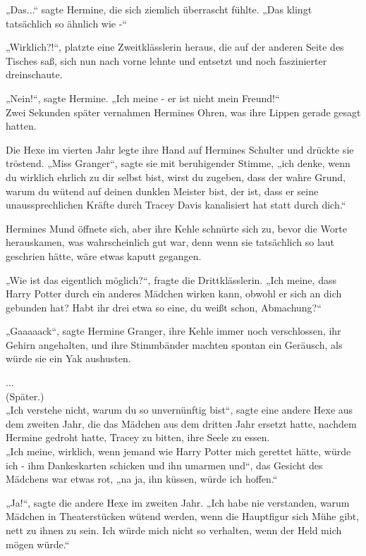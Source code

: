 {„Das...“ sagte Hermine, die sich ziemlich überrascht fühlte. „Das klingt tatsächlich so ähnlich wie -“

„Wirklich?!“, platzte eine Zweitklässlerin heraus, die auf der anderen Seite des Tisches saß, sich nun nach vorne lehnte und entsetzt und noch faszinierter dreinschaute.

„Nein!“, sagte Hermine. „Ich meine - er ist nicht mein Freund!“\\ Zwei Sekunden später vernahmen Hermines Ohren, was ihre Lippen gerade gesagt\\ hatten.

Die Hexe im vierten Jahr legte ihre Hand auf Hermines Schulter und drückte sie tröstend. „Miss Granger“, sagte sie mit beruhigender Stimme, „ich denke, wenn du wirklich ehrlich zu dir selbst bist, wirst du zugeben, dass der wahre Grund, warum du wütend auf deinen dunklen Meister bist, der ist, dass er seine unaussprechlichen Kräfte durch Tracey Davis kanalisiert hat statt durch dich.“

Hermines Mund öffnete sich, aber ihre Kehle schnürte sich zu, bevor die Worte herauskamen, was wahrscheinlich gut war, denn wenn sie tatsächlich so laut geschrien hätte, wäre etwas kaputt gegangen.

„Wie ist das eigentlich möglich?“, fragte die Drittklässlerin. „Ich meine, dass Harry Potter durch ein anderes Mädchen wirken kann, obwohl er sich an dich gebunden hat? Habt ihr drei etwa so eine, du weißt schon, Abmachung?“

„Gaaaaack“, sagte Hermine Granger, ihre Kehle immer noch verschlossen, ihr Gehirn angehalten, und ihre Stimmbänder machten spontan ein Geräusch, als würde sie ein Yak aushusten.

...\\ (Später.)\\ „Ich verstehe nicht, warum du so unvernünftig bist“, sagte eine andere Hexe aus dem zweiten Jahr, die das Mädchen aus dem dritten Jahr ersetzt hatte, nachdem Hermine gedroht hatte, Tracey zu bitten, ihre Seele zu essen.\\ „Ich meine, wirklich, wenn jemand wie Harry Potter mich gerettet hätte, würde ich - ihm Dankeskarten schicken und ihn umarmen und“, das Gesicht des Mädchens war etwas rot, „na ja, ihn küssen, würde ich hoffen.“

„Ja!“, sagte die andere Hexe im zweiten Jahr. „Ich habe nie verstanden, warum Mädchen in Theaterstücken wütend werden, wenn die Hauptfigur sich Mühe gibt, nett zu ihnen zu sein. Ich würde mich nicht so verhalten, wenn der Held mich mögen würde.“

}
